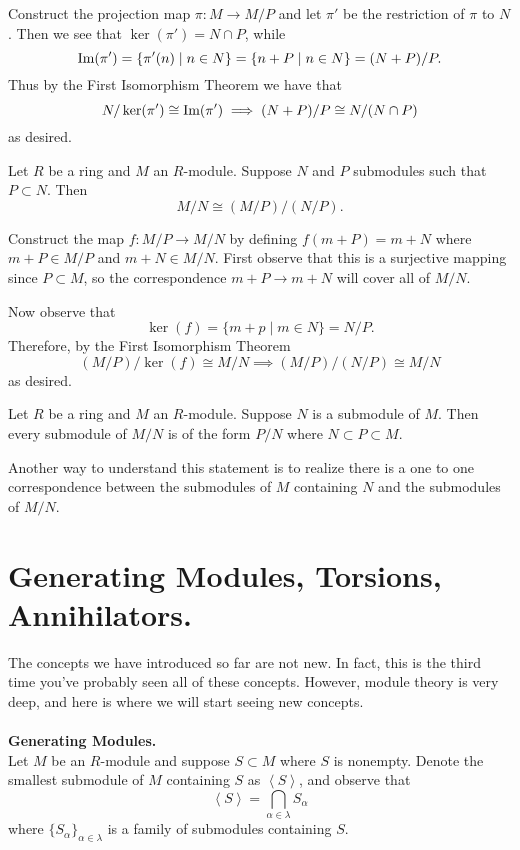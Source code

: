 \begin{prf}
    Construct the projection map $\pi : M \to M/P$ and let $\pi'$
    be the restriction of $\pi$ to $N$. Then we see that
    $\ker(\pi') = N \cap P$, while 
    \[
        \mbox{Im}(\pi') = \{\pi'(n) \mid n \in N\} = \{n + P \mid n \in N\} = (N + P)/P.
    \]
    Thus by the First Isomorphism Theorem we have that 
    \[
        N/\ker(\pi') \cong \mbox{Im}(\pi') \implies (N + P)/P \cong N/(N \cap P)
    \]
    as desired. 
\end{prf}

\begin{thm}
    Let $R$ be a ring and $M$ an $R$-module. Suppose $N$ and $P$
    submodules such that $P \subset N$. Then 
    \[
        M/N \cong (M/P)/(N/P).
    \]
    \vspace{-0.8cm}
\end{thm}

\begin{prf}
    Construct the map $f: M/P \to M/N$ by defining $f(m + P) = m +
    N$ where $m+P \in M/P$ and $m + N \in M/N$. First observe that
    this is a surjective mapping since $P \subset M$, so the
    correspondence $m + P \to m + N$ will cover all of $M/N$. 

    Now observe that 
    \[
        \ker(f) = \{m + p \mid m \in N\} = N/P.
    \]  
    Therefore, by the First Isomorphism Theorem
    \[
        (M/P)/\ker(f) \cong M/N \implies (M/P)/(N/P) \cong M/N
    \]
    as desired.
\end{prf}

\begin{thm}
    Let $R$ be a ring and $M$ an $R$-module. Suppose $N$ is a
    submodule of $M$. Then every submodule of $M/N$ is of
    the form $P/N$ where $N \subset P \subset M$. 
\end{thm}
Another way to understand this statement is to realize there is a
one to one correspondence between the submodules of $M$ containing
$N$ and the submodules of $M/N$.

\begin{prf}
    
\end{prf}


\newpage
\section{Generating Modules, Torsions, Annihilators.}
The concepts we have introduced so far are not new. In fact, this
is the third time you've probably seen all of these concepts.
However, module theory is very deep, and here is where we will
start seeing new concepts. 
\\
\\
\textbf{Generating Modules.}\\
Let $M$ be an $R$-module and suppose $S \subset M$ where $S$ is
nonempty.
Denote the
smallest submodule of $M$ containing $S$ as $\left< S \right>$,
and observe that 
\[
    \left< S \right> = \bigcap_{\alpha \in \lambda} S_{\alpha}
\]
where $\{S_\alpha\}_{\alpha \in \lambda}$ is a family of
submodules containing $S$.

